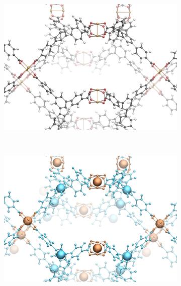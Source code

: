 \documentclass[main.tex]{subfiles}
\begin{document}
\begin{figure}[p]
	\centering
	\begin{subfigure}[t]{0.5\linewidth}
		\includegraphics[width=\linewidth]{figures/topology/mof14_1.jpg}
		\subcaption{}
	\end{subfigure}\\[5mm]
	\begin{subfigure}[t]{0.5\linewidth}
		\includegraphics[width=\linewidth]{figures/topology/mof14_2.jpg}
		\subcaption{}
	\end{subfigure}\\[5mm]
	\begin{subfigure}[t]{0.5\linewidth}

\end{subfigure}
\end{figure}
\end{document}
